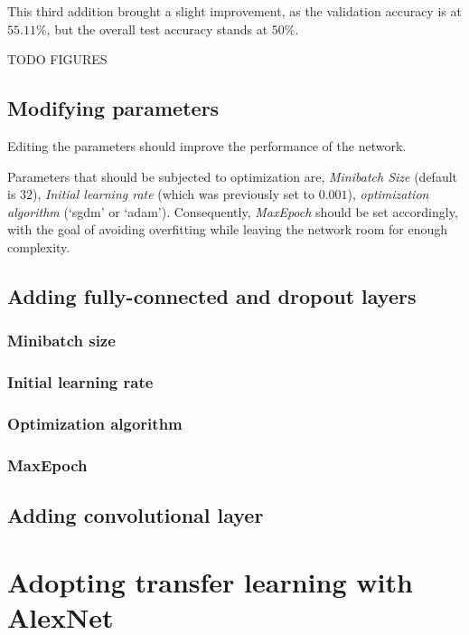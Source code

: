 \documentclass[a4paper, 11pt]{article} %
\begin{document}
This third addition brought a slight improvement, as the validation accuracy is at $55.11\%$, but the overall test accuracy stands at $50\%$.

TODO FIGURES

\subsection{Modifying parameters}

Editing the parameters should improve the performance of the network.

Parameters that should be subjected to optimization are, \emph{Minibatch Size} (default is $32$), \emph{Initial learning rate} (which was previously set to $0.001$), \emph{optimization algorithm} (`sgdm' or `adam'). Consequently, \emph{MaxEpoch} should be set accordingly, with the goal of avoiding overfitting while leaving the network room for enough complexity.

\subsection{Adding fully-connected and dropout layers}
\subsubsection{Minibatch size}
\subsubsection{Initial learning rate}
\subsubsection{Optimization algorithm}
\subsubsection{MaxEpoch}
\subsection{Adding convolutional layer}



 
\section{Adopting transfer learning with AlexNet}
\end{document}
